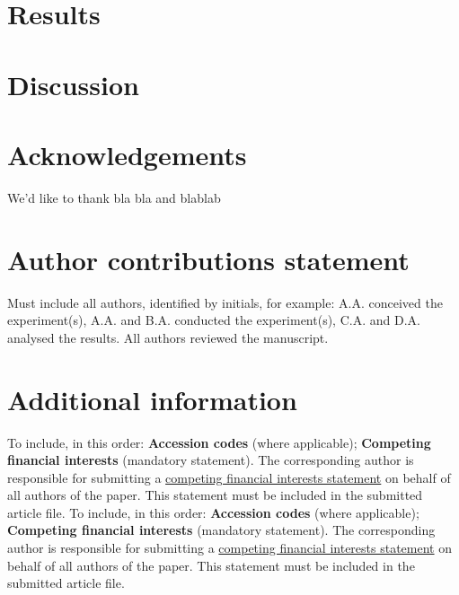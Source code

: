 \documentclass[fleqn,10pt]{wlscirep}
\begin{document}
\hypertarget{results}{%
\section{Results}\label{results}}

\hypertarget{discussion}{%
\section{Discussion}\label{discussion}}



\section*{Acknowledgements}
We'd like to thank bla bla and blablab

\section*{Author contributions statement}
Must include all authors, identified by initials, for example: A.A.
conceived the experiment(s), A.A. and B.A. conducted the experiment(s),
C.A. and D.A. analysed the results. All authors reviewed the manuscript.


\section*{Additional information}
To include, in this order: \textbf{Accession codes} (where applicable);
\textbf{Competing financial interests} (mandatory statement). The
corresponding author is responsible for submitting a
\href{http://www.nature.com/srep/policies/index.html#competing}{competing financial interests statement}
on behalf of all authors of the paper. This statement must be included
in the submitted article file.
To include, in this order: \textbf{Accession codes} (where applicable);
\textbf{Competing financial interests} (mandatory statement). The
corresponding author is responsible for submitting a
\href{http://www.nature.com/srep/policies/index.html#competing}{competing financial interests statement}
on behalf of all authors of the paper. This statement must be included
in the submitted article file.
\end{document}

